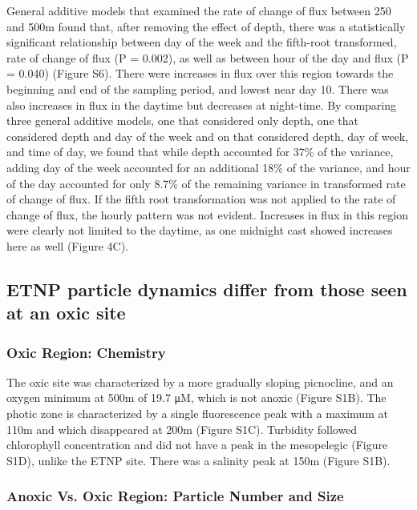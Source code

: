 \documentclass[]{article}
\begin{document}
General additive models that examined the rate of change of flux between
250 and 500m found that, after removing the effect of depth, there was a
statistically significant relationship between day of the week and the
fifth-root transformed, rate of change of flux (P = 0.002), as well as
between hour of the day and flux (P = 0.040) (Figure S6). There were
increases in flux over this region towards the beginning and end of the
sampling period, and lowest near day 10. There was also increases in
flux in the daytime but decreases at night-time. By comparing three
general additive models, one that considered only depth, one that
considered depth and day of the week and on that considered depth, day
of week, and time of day, we found that while depth accounted for 37\%
of the variance, adding day of the week accounted for an additional 18\%
of the variance, and hour of the day accounted for only 8.7\% of the
remaining variance in transformed rate of change of flux. If the fifth
root transformation was not applied to the rate of change of flux, the
hourly pattern was not evident. Increases in flux in this region were
clearly not limited to the daytime, as one midnight cast showed
increases here as well (Figure 4C).

\hypertarget{etnp-particle-dynamics-differ-from-those-seen-at-an-oxic-site}{%
\subsection{ETNP particle dynamics differ from those seen at an oxic
site}\label{etnp-particle-dynamics-differ-from-those-seen-at-an-oxic-site}}

\hypertarget{oxic-region-chemistry}{%
\subsubsection{Oxic Region: Chemistry}\label{oxic-region-chemistry}}

The oxic site was characterized by a more gradually sloping picnocline,
and an oxygen minimum at 500m of 19.7 μM, which is not anoxic (Figure
S1B). The photic zone is characterized by a single fluorescence peak
with a maximum at 110m and which disappeared at 200m (Figure S1C).
Turbidity followed chlorophyll concentration and did not have a peak in
the mesopelegic (Figure S1D), unlike the ETNP site. There was a salinity
peak at 150m (Figure S1B).

\hypertarget{anoxic-vs.-oxic-region-particle-number-and-size}{%
\subsubsection{Anoxic Vs. Oxic Region: Particle Number and
Size}\label{anoxic-vs.-oxic-region-particle-number-and-size}}
\end{document}
